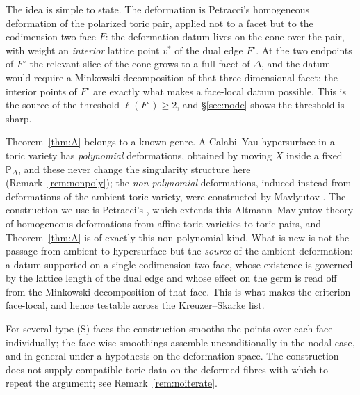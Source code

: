 \documentclass[11pt]{amsart}
\theoremstyle{definition}
\theoremstyle{remark}
\newcommand{\PP}{\mathbb{P}}
\begin{document}
The idea is simple to state.  The deformation is Petracci's homogeneous
deformation of the polarized toric pair, applied not to a facet but to
the codimension-two face $F$: the deformation datum lives on the cone
over the pair, with weight an \emph{interior} lattice point $v^\ast$ of
the dual edge $F^\circ$.  At the two endpoints of $F^\circ$ the relevant
slice of the cone grows to a full facet of $\Delta$, and the datum would
require a Minkowski decomposition of that three-dimensional facet; the
interior points of $F^\circ$ are exactly what makes a face-local datum
possible.  This is the source of the threshold $\ell(F^\circ)\ge2$, and
\S\ref{sec:node} shows the threshold is sharp.

Theorem~\ref{thm:A} belongs to a known genre.  A Calabi--Yau
hypersurface in a toric variety has \emph{polynomial} deformations,
obtained by moving $X$ inside a fixed $\PP_\Delta$, and these never
change the singularity structure here (Remark~\ref{rem:nonpoly}); the
\emph{non-polynomial} deformations, induced instead from deformations of
the ambient toric variety, were constructed by Mavlyutov \cite{Mav04}.
The construction we use is Petracci's \cite{Petracci18}, which extends
this Altmann--Mavlyutov theory of homogeneous deformations
\cite{Altmann95,Mav04} from affine toric varieties to toric pairs, and
Theorem~\ref{thm:A} is of exactly this non-polynomial kind.  What is new
is not the passage
from ambient to hypersurface but the \emph{source} of the ambient
deformation: a datum supported on a single codimension-two face, whose
existence is governed by the lattice length of the dual edge and whose
effect on the germ is read off from the Minkowski decomposition of that
face.  This is what makes the criterion face-local, and hence testable
across the Kreuzer--Skarke list.

For several type-(S) faces the construction smooths the points over each
face individually; the face-wise smoothings assemble unconditionally in
the nodal case, and in general under a hypothesis on the deformation
space.
The construction does not supply compatible toric data on the deformed
fibres with which to repeat the argument; see
Remark~\ref{rem:noiterate}.
\end{document}
